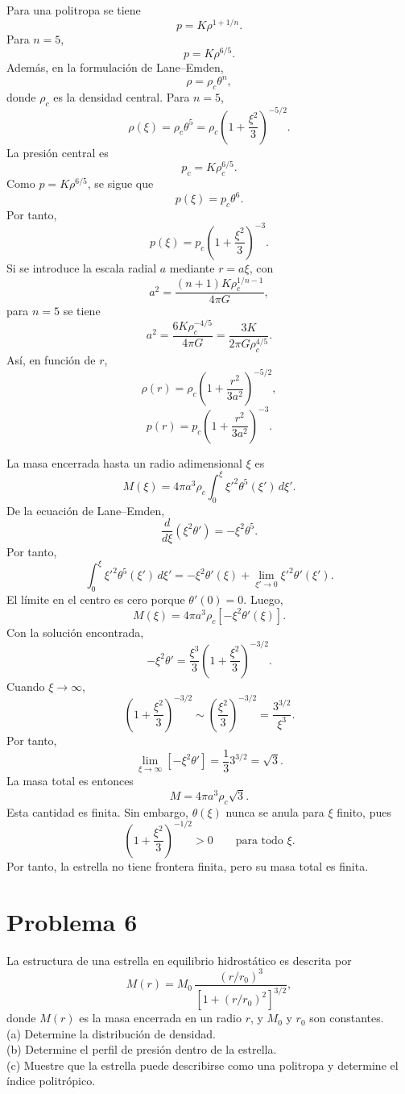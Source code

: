 \documentclass[a4paper]{article}
\begin{document}
Para una politropa se tiene
$$
p=K\rho^{1+1/n}.
$$
Para $n=5$,
$$
p=K\rho^{6/5}.
$$
Además, en la formulación de Lane--Emden,
$$
\rho=\rho_c\theta^n,
$$
donde $\rho_c$ es la densidad central. Para $n=5$,
$$
\rho(\xi)=\rho_c\theta^5
=
\rho_c
\left(1+\frac{\xi^2}{3}\right)^{-5/2}.
$$
La presión central es
$$
p_c=K\rho_c^{6/5}.
$$
Como $p=K\rho^{6/5}$, se sigue que
$$
p(\xi)=p_c\theta^6.
$$
Por tanto,
$$
p(\xi)=
p_c
\left(1+\frac{\xi^2}{3}\right)^{-3}.
$$
Si se introduce la escala radial $a$ mediante $r=a\xi$, con
$$
a^2=
\frac{(n+1)K\rho_c^{1/n-1}}{4\pi G},
$$
para $n=5$ se tiene
$$
a^2=
\frac{6K\rho_c^{-4/5}}{4\pi G}
=
\frac{3K}{2\pi G\rho_c^{4/5}}.
$$
Así, en función de $r$,
$$
\rho(r)=
\rho_c
\left(
1+\frac{r^2}{3a^2}
\right)^{-5/2},
$$
$$
p(r)=
p_c
\left(
1+\frac{r^2}{3a^2}
\right)^{-3}.
$$

La masa encerrada hasta un radio adimensional $\xi$ es
$$
M(\xi)=4\pi a^3\rho_c
\int_0^\xi \xi'^2\theta^5(\xi')\,d\xi'.
$$
De la ecuación de Lane--Emden,
$$
\frac{d}{d\xi}
\left(
\xi^2\theta'
\right)
=
-\xi^2\theta^5.
$$
Por tanto,
$$
\int_0^\xi \xi'^2\theta^5(\xi')\,d\xi'
=
-\xi^2\theta'(\xi)
+
\lim_{\xi'\to 0}\xi'^2\theta'(\xi').
$$
El límite en el centro es cero porque $\theta'(0)=0$. Luego,
$$
M(\xi)=
4\pi a^3\rho_c
\left[-\xi^2\theta'(\xi)\right].
$$
Con la solución encontrada,
$$
-\xi^2\theta'
=
\frac{\xi^3}{3}
\left(1+\frac{\xi^2}{3}\right)^{-3/2}.
$$
Cuando $\xi\to\infty$,
$$
\left(1+\frac{\xi^2}{3}\right)^{-3/2}
\sim
\left(\frac{\xi^2}{3}\right)^{-3/2}
=
\frac{3^{3/2}}{\xi^3}.
$$
Por tanto,
$$
\lim_{\xi\to\infty}
\left[-\xi^2\theta'\right]
=
\frac{1}{3}3^{3/2}
=
\sqrt{3}.
$$
La masa total es entonces
$$
M=
4\pi a^3\rho_c\sqrt{3}.
$$
Esta cantidad es finita. Sin embargo, $\theta(\xi)$ nunca se anula para $\xi$ finito, pues
$$
\left(1+\frac{\xi^2}{3}\right)^{-1/2}>0
\qquad
\text{para todo } \xi.
$$
Por tanto, la estrella no tiene frontera finita, pero su masa total es finita.


\section{Problema 6}

La estructura de una estrella en equilibrio hidrostático es descrita por
$$
M(r)=
M_0\,
\frac{(r/r_0)^3}
{\left[1+(r/r_0)^2\right]^{3/2}},
$$
donde $M(r)$ es la masa encerrada en un radio $r$, y $M_0$ y $r_0$ son constantes. \\
(a) Determine la distribución de densidad. \\
(b) Determine el perfil de presión dentro de la estrella. \\
(c) Muestre que la estrella puede describirse como una politropa y determine el índice politrópico.
\end{document}
